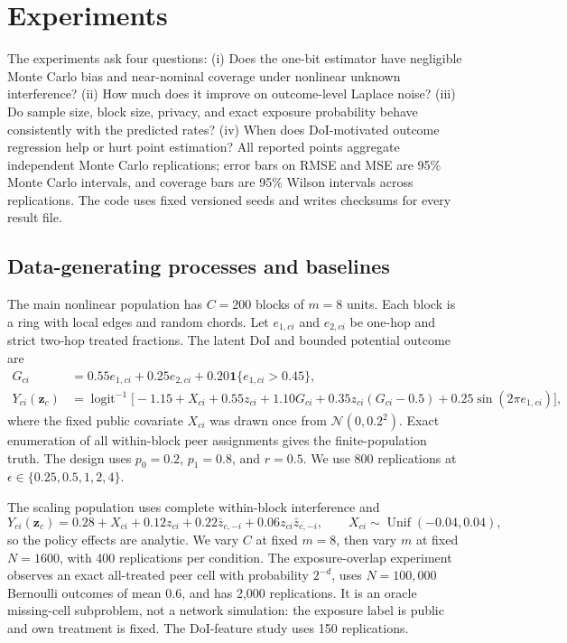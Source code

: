 \documentclass[11pt]{article}
\theoremstyle{definition}
\theoremstyle{remark}
\newcommand{\ind}{\mathbf{1}}
\begin{document}
\section{Experiments}
\label{sec:experiments}

The experiments ask four questions: (i) Does the one-bit estimator have negligible Monte Carlo
bias and near-nominal coverage under nonlinear unknown interference? (ii) How much does
it improve on outcome-level Laplace noise? (iii) Do sample size, block size, privacy, and exact
exposure probability behave consistently with the predicted rates? (iv) When does
DoI-motivated outcome regression help or hurt point estimation?
All reported points aggregate independent Monte Carlo replications; error bars on RMSE and MSE
are 95\% Monte Carlo intervals, and coverage bars are 95\% Wilson intervals across
replications. The code uses fixed versioned seeds and writes checksums for every result file.

\subsection{Data-generating processes and baselines}

The main nonlinear population has $C=200$ blocks of $m=8$ units. Each block is a ring with
local edges and random chords. Let $e_{1,ci}$ and $e_{2,ci}$ be one-hop and strict two-hop
treated fractions. The latent DoI and bounded potential outcome are
\begin{align*}
  G_{ci}&=0.55e_{1,ci}+0.25e_{2,ci}+0.20\ind\{e_{1,ci}>0.45\},\\
  Y_{ci}(\mathbf z_c)&=\operatorname{logit}^{-1}\bigl[
  -1.15+X_{ci}+0.55z_{ci}+1.10G_{ci}
  +0.35z_{ci}(G_{ci}-0.5)+0.25\sin(2\pi e_{1,ci})\bigr],
\end{align*}
where the fixed public covariate $X_{ci}$ was drawn once from $\mathcal N(0,0.2^2)$. Exact
enumeration of all within-block peer assignments gives the finite-population truth. The design
uses $p_0=0.2$, $p_1=0.8$, and $r=0.5$. We use 800 replications at
$\epsilon\in\{0.25,0.5,1,2,4\}$.

The scaling population uses complete within-block interference and
\[
  Y_{ci}(\mathbf z_c)=0.28+X_{ci}+0.12z_{ci}+0.22\bar z_{c,-i}
  +0.06z_{ci}\bar z_{c,-i}, \qquad X_{ci}\sim\operatorname{Unif}(-0.04,0.04),
\]
so the policy effects are analytic. We vary $C$ at fixed $m=8$, then vary $m$ at fixed
$N=1600$, with 400 replications per condition. The exposure-overlap experiment observes an
exact all-treated peer cell with probability $2^{-d}$, uses $N=100{,}000$ Bernoulli outcomes
of mean $0.6$, and has 2,000 replications. It is an oracle missing-cell subproblem, not a
network simulation: the exposure label is public and own treatment is fixed. The
DoI-feature study uses 150 replications.
\end{document}
